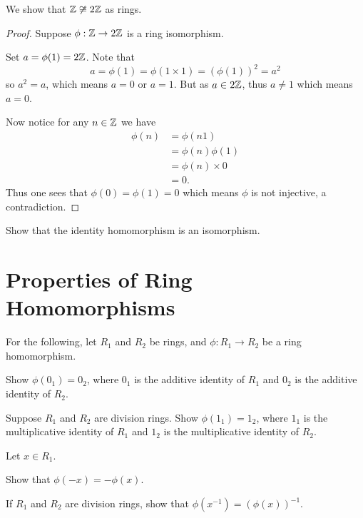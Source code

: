 \begin{example}
    We show that $\mathbb{Z} \not\cong 2\mathbb{Z}$ as rings.

    \begin{proof}
        Suppose $\phi: \mathbb{Z} \to 2\mathbb{Z}$ is a ring isomorphism.

        Set $a = \phi(1) = 2\mathbb{Z}$. Note that
        \[
            a = \phi(1) = \phi(1\times1) = (\phi(1))^2 = a^2
        \]
        so $a^2 = a$, which means $a = 0$ or $a = 1$. But as $a \in 2\mathbb{Z}$, thus $a \neq 1$ which means $a = 0$.

        Now notice for any $n \in \mathbb{Z}$ we have
        \begin{align*}
            \phi(n) &= \phi(n1)\\
            &= \phi(n)\phi(1)\\
            &= \phi(n) \times 0\\
            &= 0.
        \end{align*}
        Thus one sees that $\phi(0) = \phi(1) = 0$ which means $\phi$ is not injective, a contradiction.
    \end{proof}
\end{example}
\begin{exercise}\label{exercise-identity-homomorphism-is-an-isomorphism}
    Show that the identity homomorphism is an isomorphism.
\end{exercise}

\section{Properties of Ring Homomorphisms}
For the following, let $R_1$ and $R_2$ be rings, and $\phi: R_1 \to R_2$ be a ring homomorphism.

\begin{exercise}\label{exercise-image-of-additive-identity-is-additive-identity}
    Show $\phi(0_1) = 0_2$, where $0_1$ is the additive identity of $R_1$ and $0_2$ is the additive identity of $R_2$.
\end{exercise}

\begin{exercise}
    Suppose $R_1$ and $R_2$ are division rings. Show $\phi(1_1) = 1_2$, where $1_1$ is the multiplicative identity of $R_1$ and $1_2$ is the multiplicative identity of $R_2$.
\end{exercise}

\begin{exercise}
    Let $x \in R_1$.
    \begin{partquestions}{\alph*}
        \item Show that $\phi(-x) = -\phi(x)$.
        \item If $R_1$ and $R_2$ are division rings, show that $\phi(x^{-1}) = (\phi(x))^{-1}$.
    \end{partquestions}
\end{exercise}

